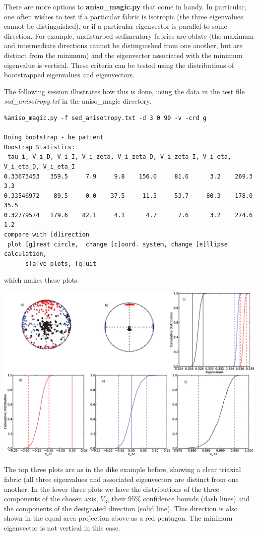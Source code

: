 \documentclass[11pt]{book}
\begin{document}
{There are more options to {\bf aniso\_magic.py} that come in handy.   In particular, one often wishes to test if a particular fabric is isotropic (the three eigenvalues cannot be distinguished), or if a particular eigenvector is parallel to some direction. For example, undisturbed sedimentary fabrics are oblate (the maximum and intermediate directions cannot be distinguished from one another, but are distinct from the minimum) and the eigenvector associated with the minimum eigenvalue is vertical. These criteria can be tested using the distributions of bootstrapped eigenvalues and eigenvectors.

The following session illustrates how this is done, using the data in the test file {\it sed\_anisotropy.txt} in the aniso\_magic directory.

\begin{verbatim}
%aniso_magic.py -f sed_anisotropy.txt -d 3 0 90 -v -crd g

Doing bootstrap - be patient
Boostrap Statistics:
 tau_i, V_i_D, V_i_I, V_i_zeta, V_i_zeta_D, V_i_zeta_I, V_i_eta, V_i_eta_D, V_i_eta_I
0.33673453   359.5     7.9     9.8    156.0     81.6      3.2    269.3      3.3
0.33546972    89.5     0.0    37.5     11.5     53.7     80.3    178.0     35.5
0.32779574   179.6    82.1     4.1      4.7      7.6      3.2    274.6      1.2
compare with [d]irection
 plot [g]reat circle,  change [c]oord. system, change [e]llipse calculation,
      s[a]ve plots, [q]uit
 \end{verbatim}

 which makes these plots:

   \includegraphics[width=15cm]{EPSfiles/sed-aniso.eps}

   The top three plots are as in the dike example before, showing a clear triaxial fabric (all three eigenvalues and associated eigenvectors are distinct from one another.  In the lower three plots we have the distributions of the three components of the chosen axis,  $V_3$, their 95\% confidence bounds (dash lines) and the components of the designated direction (solid line).  This direction is also shown in the equal area projection above as a red pentagon.  The minimum eigenvector is not vertical in this case.



}
\end{document}
